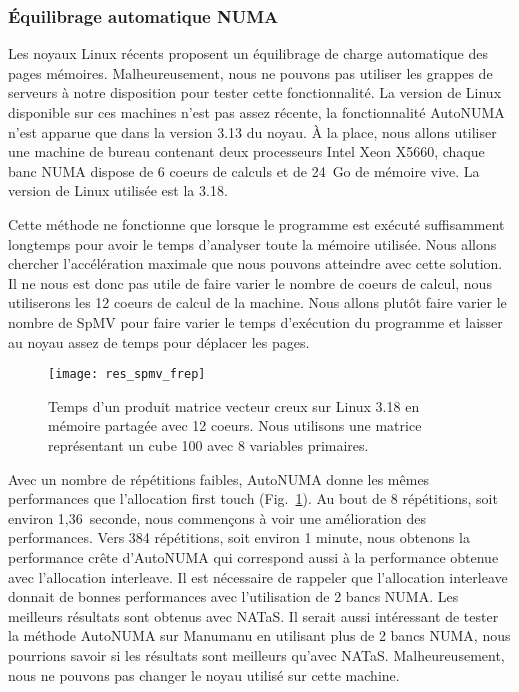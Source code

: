\subsubsection{\'Equilibrage automatique NUMA}
Les noyaux Linux récents proposent un équilibrage de charge automatique des pages mémoires.
%
Malheureusement, nous ne pouvons pas utiliser les grappes de serveurs à notre disposition pour tester cette fonctionnalité.
%
La version de Linux disponible sur ces machines n'est pas assez récente, la fonctionnalité AutoNUMA n'est apparue que dans la version 3.13 du noyau.
%
\`A la place, nous allons utiliser une machine de bureau contenant deux processeurs Intel Xeon X5660, chaque banc NUMA dispose de 6 coeurs de calculs et de 24~Go de mémoire vive.
%
La version de Linux utilisée est la 3.18.

Cette méthode ne fonctionne que lorsque le programme est exécuté suffisamment longtemps pour avoir le temps d'analyser toute la mémoire utilisée.
%
Nous allons chercher l'accélération maximale que nous pouvons atteindre avec cette solution.
%
Il ne nous est donc pas utile de faire varier le nombre de coeurs de calcul, nous utiliserons les 12 coeurs de calcul de la machine.
%
Nous allons plutôt faire varier le nombre de SpMV pour faire varier le temps d'exécution du programme et laisser au noyau assez de temps pour déplacer les pages.

\begin{figure}
  \centering
  \texttt{[image: res\_spmv\_frep]}
  \caption{Temps d'un produit matrice vecteur creux sur Linux 3.18 en mémoire partagée avec 12 coeurs. Nous utilisons une matrice représentant un cube 100 avec 8 variables primaires.}
  \label{fig:res_spmv_frep}
\end{figure}

Avec un nombre de répétitions faibles, AutoNUMA donne les mêmes performances que l'allocation first touch (Fig.~\ref{fig:res_spmv_frep}).
%
Au bout de 8 répétitions, soit environ 1,36~seconde, nous commençons à voir une amélioration des performances.
%
Vers 384 répétitions, soit environ 1 minute, nous obtenons la performance crête d'AutoNUMA qui correspond aussi à la performance obtenue avec l'allocation interleave.
%
Il est nécessaire de rappeler que l'allocation interleave donnait de bonnes performances avec l'utilisation de 2 bancs NUMA.
%
Les meilleurs résultats sont obtenus avec NATaS.
%
Il serait aussi intéressant de tester la méthode AutoNUMA sur Manumanu en utilisant plus de 2 bancs NUMA, nous pourrions savoir si les résultats sont meilleurs qu'avec NATaS.
%
Malheureusement, nous ne pouvons pas changer le noyau utilisé sur cette machine.
